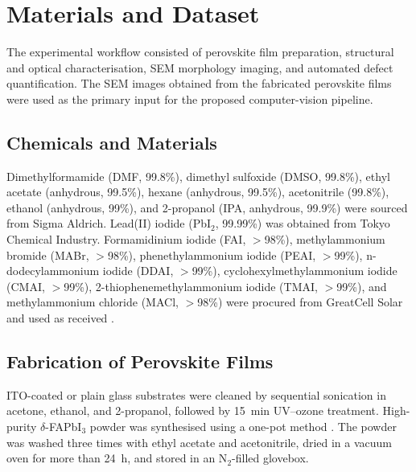 \documentclass[pdflatex,sn-mathphys-num,iicol]{sn-jnl}
\theoremstyle{thmstyleone}
\theoremstyle{thmstyletwo}
\theoremstyle{thmstylethree}
\begin{document}

\section{Materials and Dataset}\label{sec:materials_dataset}

The experimental workflow consisted of perovskite film preparation,
structural and optical characterisation, SEM morphology imaging, and
automated defect quantification. The SEM images obtained from the
fabricated perovskite films were used as the primary input for the
proposed computer-vision pipeline.

\subsection{Chemicals and Materials}\label{subsec:chemicals_materials}

Dimethylformamide (DMF, 99.8\%), dimethyl sulfoxide (DMSO, 99.8\%),
ethyl acetate (anhydrous, 99.5\%), hexane (anhydrous, 99.5\%),
acetonitrile (99.8\%), ethanol (anhydrous, 99\%), and 2-propanol
(IPA, anhydrous, 99.9\%) were sourced from Sigma Aldrich. Lead(II)
iodide (PbI$_2$, 99.99\%) was obtained from Tokyo Chemical Industry.
Formamidinium iodide (FAI, $>$98\%), methylammonium bromide (MABr,
$>$98\%), phenethylammonium iodide (PEAI, $>$99\%), n-dodecylammonium
iodide (DDAI, $>$99\%), cyclohexylmethylammonium iodide (CMAI,
$>$99\%), 2-thiophenemethylammonium iodide (TMAI, $>$99\%), and
methylammonium chloride (MACl, $>$98\%) were procured from GreatCell
Solar and used as received \cite{ref23}.

\subsection{Fabrication of Perovskite Films}\label{subsec:fabrication}

ITO-coated or plain glass substrates were cleaned by sequential
sonication in acetone, ethanol, and 2-propanol, followed by 15~min
UV--ozone treatment. High-purity $\delta$-FAPbI$_3$ powder was
synthesised using a one-pot method \cite{ref23}. The powder was
washed three times with ethyl acetate and acetonitrile, dried in a
vacuum oven for more than 24~h, and stored in an N$_2$-filled
glovebox.
\end{document}
